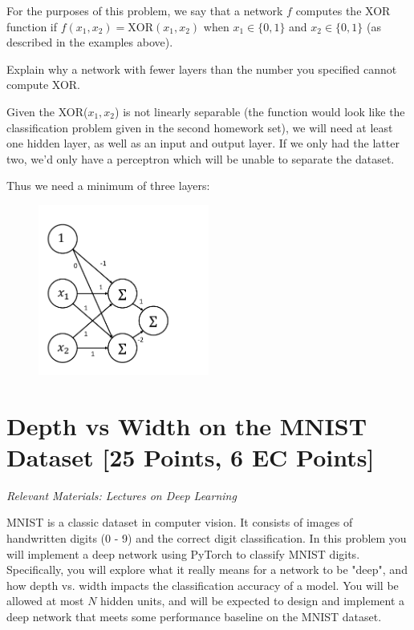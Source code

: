 For the purposes of this problem, we say that a network $f$ computes the XOR function if $f(x_1, x_2) = \text{XOR}(x_1, x_2)$ when $x_1 \in \{0, 1\}$ and $x_2 \in \{0, 1\}$ (as described in the examples above).

Explain why a network with fewer layers than the number you specified cannot compute XOR.


\begin{subsolution}
 Given the XOR($x_1,x_2$) is not linearly separable (the function would look like the classification problem given in the second homework set), we will need at least one hidden layer, as well as an input and output layer. If we only had the latter two, we'd only have a perceptron which will be unable to separate the dataset. 

 Thus we need a minimum of three layers:

 \begin{figure}[H]
  \begin{center}
  \includegraphics[width=0.5\textwidth]{P1D.pdf}
  \end{center}
  \end{figure}
\end{subsolution}


\newpage
\section{Depth vs Width on the MNIST Dataset  [25 Points, 6 EC Points]}

\textit{Relevant Materials: Lectures on Deep Learning}

MNIST is a classic dataset in computer vision. It consists of images of handwritten digits (0 - 9) and the correct digit classification. In this problem you will implement a deep network using PyTorch to classify MNIST digits. Specifically, you will explore what it really means for a network to be "deep", and how depth vs. width impacts the classification accuracy of a model. You will be allowed at most $N$ hidden units, and will be expected to design and implement a deep network that meets some performance baseline on the MNIST dataset.

